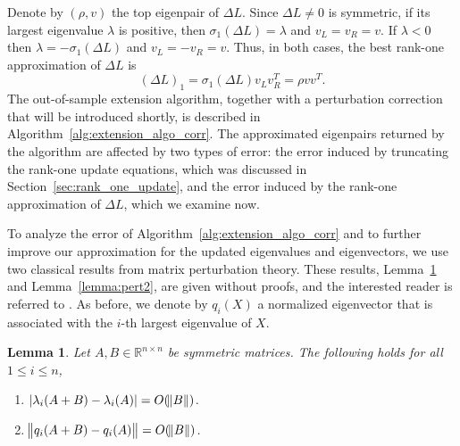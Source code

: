 \documentclass[11pt]{article}
\newtheorem{lemma}[theorem]{Lemma}
\begin{document}
Denote by $(\rho, v)$ the top eigenpair of $\Delta L$. Since $\Delta L \neq 0$ is symmetric, if its largest eigenvalue $\lambda$ is positive, then $\sigma_1(\Delta L) = \lambda$ and $v_L = v_R = v$. If $\lambda < 0$ then $\lambda = -\sigma_1(\Delta L)$ and $v_L = -v_R = v$. Thus, in both cases, the best rank-one approximation of $\Delta L$ is
\begin{equation} \label{eqn:deltaL1}
(\Delta L)_1 = \sigma_1(\Delta L)v_Lv_R^T = \rho vv^T.
\end{equation} 
The out-of-sample extension algorithm, together with a perturbation correction that will be introduced shortly, is described in Algorithm~\ref{alg:extension_algo_corr}. The approximated eigenpairs returned by the algorithm are affected by two types of error: the error induced by truncating the rank-one update equations, which was discussed in Section~\ref{sec:rank_one_update}, and the error induced by the rank-one approximation of $\Delta L$, which we examine now. 

To analyze the error of Algorithm~\ref{alg:extension_algo_corr} and to further improve our approximation for the updated eigenvalues and eigenvectors, we use two classical results from matrix perturbation theory. These results, Lemma~\ref{lemma:pert1} and Lemma~\ref{lemma:pert2}, are given without proofs, and the interested reader is referred to \cite[Chapter~4]{byron2012mathematics}. As before, we denote by $q_i(X)$ a normalized eigenvector that is associated with the $i$-th largest eigenvalue of $X$.
\begin{lemma} \label{lemma:pert1}
Let $A, B \in \mathbb{R}^{n \times n}$ be symmetric matrices. The following holds for all $1 \le i \le n$,
\begin{enumerate}
	\item $|\lambda_i(A +  B) - \lambda_i(A)| = O( \norm{B} )$.
	\item $\norm{q_i(A + B) - q_i(A)} = O( \norm{B} )$.
\end{enumerate}
\end{lemma}
\end{document}
